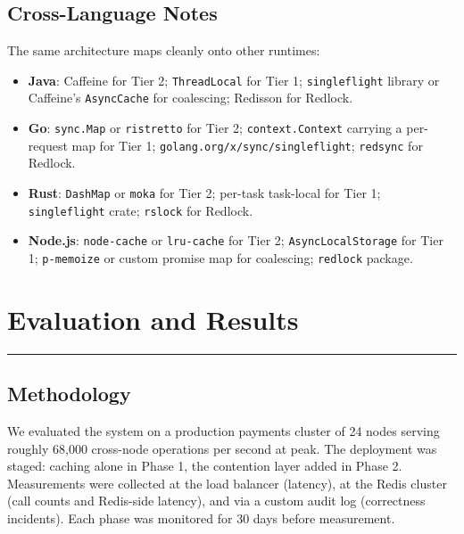 \documentclass[12pt,a4paper,oneside]{report}
\begin{document}
\section{Cross-Language Notes}
The same architecture maps cleanly onto other runtimes:
\begin{itemize}[leftmargin=*]
    \item \textbf{Java}: Caffeine for Tier 2; \texttt{ThreadLocal} for Tier 1; \texttt{singleflight} library or Caffeine's \texttt{AsyncCache} for coalescing; Redisson for Redlock.
    \item \textbf{Go}: \texttt{sync.Map} or \texttt{ristretto} for Tier 2; \texttt{context.Context} carrying a per-request map for Tier 1; \texttt{golang.org/x/sync/singleflight}; \texttt{redsync} for Redlock.
    \item \textbf{Rust}: \texttt{DashMap} or \texttt{moka} for Tier 2; per-task task-local for Tier 1; \texttt{singleflight} crate; \texttt{rslock} for Redlock.
    \item \textbf{Node.js}: \texttt{node-cache} or \texttt{lru-cache} for Tier 2; \texttt{AsyncLocalStorage} for Tier 1; \texttt{p-memoize} or custom promise map for coalescing; \texttt{redlock} package.
\end{itemize}


\chapter{Evaluation and Results}
\label{chap:eval}
\vspace{-1cm}
\noindent \rule{6.6in}{0.01in}

\section{Methodology}
We evaluated the system on a production payments cluster of 24 nodes serving roughly 68{,}000 cross-node operations per second at peak. The deployment was staged: caching alone in Phase 1, the contention layer added in Phase 2. Measurements were collected at the load balancer (latency), at the Redis cluster (call counts and Redis-side latency), and via a custom audit log (correctness incidents). Each phase was monitored for 30 days before measurement.
\end{document}
